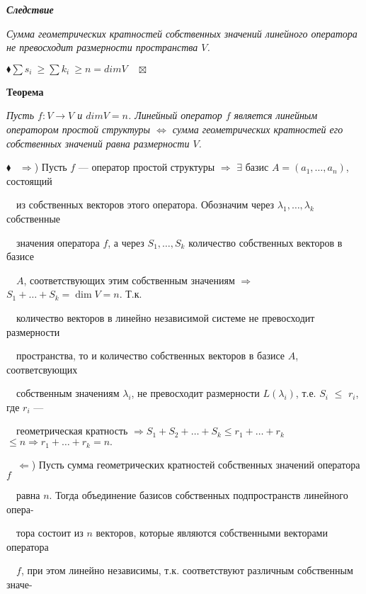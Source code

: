 \documentclass[a4paper, 12pt]{report}
\begin{document}
	\par\bigskip
	\textit{\textbf{Следствие}}
	
	\textit{Сумма геометрических кратностей собственных значений линейного оператора не превосходит размерности пространства $V$.}
	\par\bigskip
	$\blacklozenge \sum s_i \ \geqslant \sum k_i \ \geqslant n = dim V \quad \boxtimes$
	
	\par\bigskip
	\textbf{Теорема}
	
	\textit{Пусть $f : V \rightarrow V$ и $dim V = n$. Линейный оператор $f$ является линейным оператором простой структуры $\Longleftrightarrow$ сумма геометрических кратностей его собственных значений равна размерности $V$.}
	\par\bigskip
	$\blacklozenge$ \ $\Rightarrow$) Пусть $f$ --- оператор простой структуры $\Rightarrow$ $\exists$ базис $A = (a_1, \dots, a_n)$, состоящий
	
	$\quad$из собственных векторов этого оператора. Обозначим через $\lambda_1, \dots, \lambda_k$ собственные
	
	$\quad$значения оператора $f$, а через $S_1, \dots, S_k$ количество собственных векторов в базисе 
	
	$\quad$$A$, соответствующих этим собственным значениям $\Rightarrow$ $S_1 + \dots + S_k = \dim V = n$. Т.к. 
	
	$\quad$количество векторов в линейно независимой системе не превосходит размерности 
	
	$\quad$пространства, то и количество собственных векторов в базисе $A$, соответсвующих 
	
	$\quad$собственным значениям $\lambda_i$, не превосходит размерности $L(\lambda_i)$, т.е. $S_i$ $\leqslant$ $r_i$, где $r_i$ --- 
	
	$\quad$геометрическая кратность $\Rightarrow S_1 + S_2 + \dots + S_k \leqslant r_1 + \dots + r_k$ $\leqslant n \Rightarrow r_1 + \dots + r_k = n.$
	\par\bigskip
	$\quad \Leftarrow$) Пусть сумма геометрических кратностей собственных значений оператора $f$ 
	
	$\quad$равна $n$. Тогда объединение базисов собственных подпространств линейного опера-
	
	$\quad$тора состоит из $n$ векторов, которые являются собственными векторами оператора 
	
	$\quad f$, при этом линейно независимы, т.к. соответствуют различным собственным значе-
	
\end{document}
